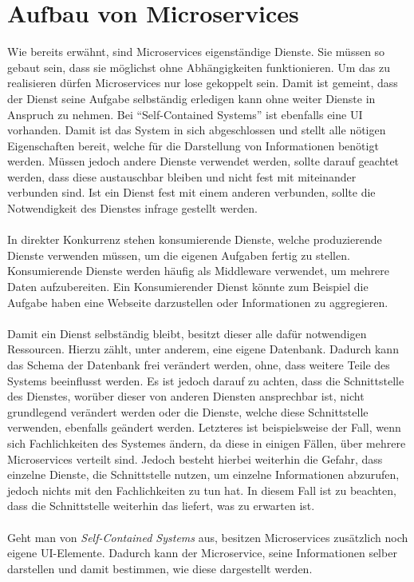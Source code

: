 \section{Aufbau von Microservices}
\label{sec:Aufbau}
Wie bereits erwähnt, sind Microservices eigenständige Dienste. Sie müssen so gebaut sein, dass sie möglichst ohne Abhängigkeiten funktionieren. Um das zu realisieren dürfen Microservices nur lose gekoppelt sein. Damit ist gemeint, dass der Dienst seine Aufgabe selbständig erledigen kann ohne weiter Dienste in Anspruch zu nehmen. Bei "`Self-Contained Systems"' ist ebenfalls eine UI vorhanden. Damit ist das System in sich abgeschlossen und stellt  alle nötigen Eigenschaften bereit, welche für die Darstellung von Informationen benötigt werden. Müssen jedoch andere Dienste verwendet werden, sollte darauf geachtet werden, dass diese austauschbar bleiben und nicht fest mit miteinander verbunden sind. Ist ein Dienst fest mit einem anderen verbunden, sollte die Notwendigkeit des Dienstes infrage gestellt werden.
\\\\
In direkter Konkurrenz stehen konsumierende Dienste, welche produzierende Dienste verwenden müssen, um die eigenen Aufgaben fertig zu stellen. Konsumierende Dienste werden häufig als Middleware verwendet, um mehrere Daten aufzubereiten. Ein Konsumierender Dienst könnte zum Beispiel die Aufgabe haben eine Webseite darzustellen oder Informationen zu aggregieren.
\\\\
Damit ein Dienst selbständig bleibt, besitzt dieser alle dafür notwendigen Ressourcen. Hierzu zählt, unter anderem, eine eigene Datenbank. Dadurch kann das Schema der Datenbank frei verändert werden, ohne, dass weitere Teile des Systems beeinflusst werden. Es ist jedoch darauf zu achten, dass die Schnittstelle des Dienstes, worüber dieser von anderen Diensten ansprechbar ist, nicht grundlegend verändert werden oder die Dienste, welche diese Schnittstelle verwenden, ebenfalls geändert werden. Letzteres ist beispielsweise der Fall, wenn sich Fachlichkeiten des Systemes ändern, da diese in einigen Fällen, über mehrere Microservices verteilt sind. Jedoch besteht hierbei weiterhin die Gefahr, dass einzelne Dienste, die Schnittstelle nutzen, um einzelne Informationen abzurufen, jedoch nichts mit den Fachlichkeiten zu tun hat. In diesem Fall ist zu beachten, dass die Schnittstelle weiterhin das liefert, was zu erwarten ist.
\\\\
Geht man von \textit{Self-Contained Systems} aus, besitzen Microservices zusätzlich noch eigene UI-Elemente. Dadurch kann der Microservice, seine Informationen selber darstellen und damit bestimmen, wie diese dargestellt werden.

